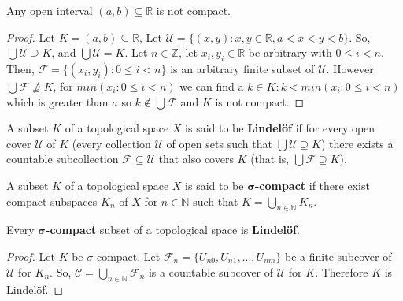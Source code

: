 \documentclass{article}
\begin{document}
	\begin{proposition}
	  Any open interval \((a,b)\subseteq\mathbb R\) is not compact.
	\end{proposition}
	\begin{proof}
	Let $K = (a, b) \subseteq \mathbb{R}$, Let $\mathcal{U} = \lbrace (x, y) : x, y \in \mathbb{R}, a < x < y < b \rbrace$. So, $\bigcup \mathcal{U} \supseteq K$, and $\bigcup \mathcal{U} = K$. Let $n \in \mathbb{Z}$, let $x_i, y_i \in \mathbb{R}$ be arbitrary with $0 \leq i < n$. Then, $\mathcal{F} = \lbrace (x_i, y_i) : 0 \leq i < n \rbrace$ is an arbitrary finite subset of $\mathcal{U}$. However $\bigcup \mathcal{F} \not\supseteq K$, for $min(x_i : 0 \leq i < n)$ we can find a $k \in K : k < min(x_i : 0 \leq i < n)$ which is greater than $a$ so $k \not\in \bigcup \mathcal{F}$ and $K$ is not compact.
	\end{proof}

	\begin{definition}
	  A subset \(K\) of a topological space \(X\) is said to be \textbf{Lindel\"of} if for every
	  open cover \(\mathcal U\) of \(K\) (every collection \(\mathcal U\) of open sets
	  such that \(\bigcup \mathcal U\supseteq K\)) there exists a countable subcollection
	  \(\mathcal F\subseteq \mathcal U\) that also covers \(K\) (that is,
	  \(\bigcup\mathcal F\supseteq K\)).
	\end{definition}

	\begin{definition}
	  A subset \(K\) of a topological space \(X\) is said to be \textbf{\(\boldsymbol{\sigma}\)-compact} if
	  there exist compact subspaces \(K_n\) of \(X\) for \(n\in\mathbb N\) such that
	  \(K=\bigcup_{n\in\mathbb N} K_n\).
	  \newline \newline
	\end{definition}
	\begin{theorem}
		Every \(\boldsymbol{\sigma}\)\textbf{-compact} subset of a topological space is \textbf{Lindel\"of}.
	\end{theorem}
	\begin{proof}
	Let $K$ be \(\sigma\)-compact. Let $\mathcal{F}_n = \lbrace U_{n0}, U_{n1}, ..., U_{nm} \rbrace$ be a finite subcover of $\mathcal{U}$ for $K_n$. So, $\mathcal{C} = \bigcup_{n \in \mathbb{N}} \mathcal{F}_n$ is a countable subcover of $\mathcal{U}$ for $K$. Therefore $K$ is Lindel\"of.
	
	\end{proof}
\end{document}

